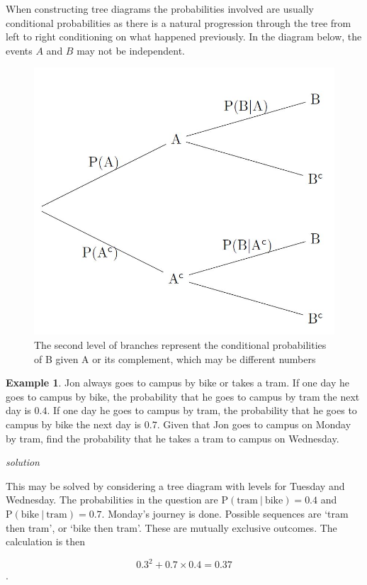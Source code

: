 \documentclass[
]{book}
\theoremstyle{definition}
\theoremstyle{definition}
\newtheorem{example}{Example}[chapter]
\theoremstyle{definition}
\theoremstyle{definition}
\theoremstyle{remark}
\begin{document}
When constructing tree diagrams the probabilities involved are usually conditional probabilities as there is a natural progression through the tree from left to right conditioning on what happened previously. In the diagram below, the events \(A\) and \(B\) may not be independent.

\begin{figure}

{\centering \includegraphics[width=11.31in]{./figures/condtree} 

}

\caption{The second level of branches represent the conditional probabilities of B given A or its complement, which may be different numbers}\label{fig:tree2}
\end{figure}

\begin{example}
Jon always goes to campus by bike or takes a tram. If one day he goes to campus by bike, the probability that he goes to campus by tram the next day is \(0.4\). If one day he goes to campus by tram, the probability that he goes to campus by bike the next day is \(0.7\).
Given that Jon goes to campus on Monday by tram, find the probability that he takes a tram to campus on Wednesday.

\emph{solution}

This may be solved by considering a tree diagram with levels for Tuesday and Wednesday. The probabilities in the question are \(\text{P}(\text{tram} \ |\ \text{bike})=0.4\) and \(\text{P}(\text{bike} \ |\ \text{tram})=0.7\).
Monday's journey is done. Possible sequences are `tram then tram', or `bike then tram'. These are mutually exclusive outcomes. The calculation is then

\[0.3^2+0.7\times 0.4 = 0.37\].
\end{example}
\end{document}
